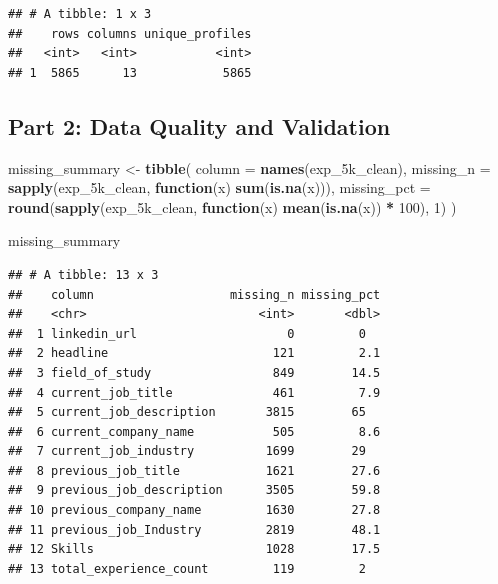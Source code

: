 \documentclass[
]{article}
\newenvironment{Shaded}{\begin{snugshade}}{\end{snugshade}}
\newcommand{\AttributeTok}[1]{\textcolor[rgb]{0.13,0.29,0.53}{#1}}
\newcommand{\ControlFlowTok}[1]{\textcolor[rgb]{0.13,0.29,0.53}{\textbf{#1}}}
\newcommand{\DecValTok}[1]{\textcolor[rgb]{0.00,0.00,0.81}{#1}}
\newcommand{\FunctionTok}[1]{\textcolor[rgb]{0.13,0.29,0.53}{\textbf{#1}}}
\newcommand{\NormalTok}[1]{#1}
\newcommand{\OtherTok}[1]{\textcolor[rgb]{0.56,0.35,0.01}{#1}}
\newcommand{\SpecialCharTok}[1]{\textcolor[rgb]{0.81,0.36,0.00}{\textbf{#1}}}
\begin{document}
\begin{Shaded}
\end{Shaded}

\begin{verbatim}
## # A tibble: 1 x 3
##    rows columns unique_profiles
##   <int>   <int>           <int>
## 1  5865      13            5865
\end{verbatim}

\subsection{Part 2: Data Quality and
Validation}\label{part-2-data-quality-and-validation}

\begin{Shaded}
\begin{Highlighting}[]
\NormalTok{missing\_summary }\OtherTok{\textless{}{-}} \FunctionTok{tibble}\NormalTok{(}
  \AttributeTok{column =} \FunctionTok{names}\NormalTok{(exp\_5k\_clean),}
  \AttributeTok{missing\_n =} \FunctionTok{sapply}\NormalTok{(exp\_5k\_clean, }\ControlFlowTok{function}\NormalTok{(x) }\FunctionTok{sum}\NormalTok{(}\FunctionTok{is.na}\NormalTok{(x))),}
  \AttributeTok{missing\_pct =} \FunctionTok{round}\NormalTok{(}\FunctionTok{sapply}\NormalTok{(exp\_5k\_clean, }\ControlFlowTok{function}\NormalTok{(x) }\FunctionTok{mean}\NormalTok{(}\FunctionTok{is.na}\NormalTok{(x)) }\SpecialCharTok{*} \DecValTok{100}\NormalTok{), }\DecValTok{1}\NormalTok{)}
\NormalTok{)}

\NormalTok{missing\_summary}
\end{Highlighting}
\end{Shaded}

\begin{verbatim}
## # A tibble: 13 x 3
##    column                   missing_n missing_pct
##    <chr>                        <int>       <dbl>
##  1 linkedin_url                     0         0  
##  2 headline                       121         2.1
##  3 field_of_study                 849        14.5
##  4 current_job_title              461         7.9
##  5 current_job_description       3815        65  
##  6 current_company_name           505         8.6
##  7 current_job_industry          1699        29  
##  8 previous_job_title            1621        27.6
##  9 previous_job_description      3505        59.8
## 10 previous_company_name         1630        27.8
## 11 previous_job_Industry         2819        48.1
## 12 Skills                        1028        17.5
## 13 total_experience_count         119         2
\end{verbatim}
\end{document}
